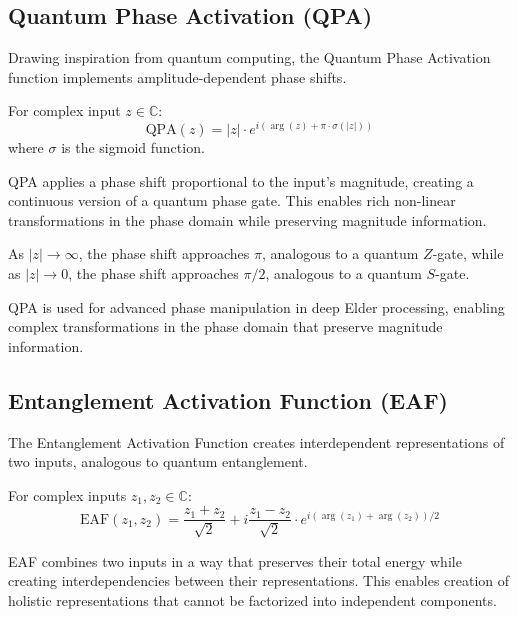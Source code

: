 \subsection{Quantum Phase Activation (QPA)}

Drawing inspiration from quantum computing, the Quantum Phase Activation function implements amplitude-dependent phase shifts.

\begin{definition}
For complex input $z \in \mathbb{C}$:
\begin{equation}
\text{QPA}(z) = |z| \cdot e^{i(\arg(z) + \pi \cdot \sigma(|z|))}
\end{equation}
where $\sigma$ is the sigmoid function.
\end{definition}

QPA applies a phase shift proportional to the input's magnitude, creating a continuous version of a quantum phase gate. This enables rich non-linear transformations in the phase domain while preserving magnitude information.

\begin{observation}
As $|z| \to \infty$, the phase shift approaches $\pi$, analogous to a quantum $Z$-gate, while as $|z| \to 0$, the phase shift approaches $\pi/2$, analogous to a quantum $S$-gate.
\end{observation}

QPA is used for advanced phase manipulation in deep Elder processing, enabling complex transformations in the phase domain that preserve magnitude information.

\subsection{Entanglement Activation Function (EAF)}

The Entanglement Activation Function creates interdependent representations of two inputs, analogous to quantum entanglement.

\begin{definition}
For complex inputs $z_1, z_2 \in \mathbb{C}$:
\begin{equation}
\text{EAF}(z_1, z_2) = \frac{z_1 + z_2}{\sqrt{2}} + i\frac{z_1 - z_2}{\sqrt{2}} \cdot e^{i(\arg(z_1) + \arg(z_2))/2}
\end{equation}
\end{definition}

EAF combines two inputs in a way that preserves their total energy while creating interdependencies between their representations. This enables creation of holistic representations that cannot be factorized into independent components.

